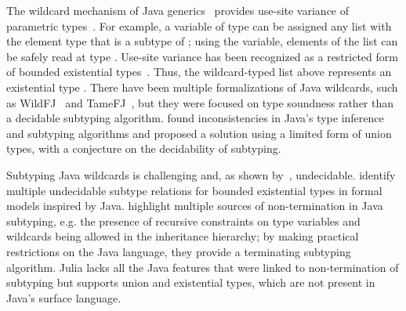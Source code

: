The wildcard mechanism of Java generics~\cite{bib:torgersen:wildcards:2004}
provides use-site variance of parametric
types~\cite{bib:thorup:unif-genericity:1999}.
For example, a variable of type 
can be assigned any list with the element type that is a subtype of ;
using the variable, elements of the list can be safely read at type .
Use-site variance has been recognized as a restricted form of bounded existential
types~\cite{bib:igarashi:variance:2002}.
Thus, the wildcard-typed list above represents an existential
type .
There have been multiple formalizations of Java wildcards,
such as WildFJ~\cite{bib:torgersen:wildfj:2005} and
TameFJ~\cite{bib:cameron:java-wildcards:2008}, but they
were focused on type soundness rather than a decidable subtyping algorithm.
\citet{bib:smith:java-type-inf:2008} found inconsistencies in Java's type inference
and subtyping algorithms and proposed a solution using a limited form of union
types, with a conjecture on the decidability of subtyping.

Subtyping Java wildcards is challenging and, as shown
by~\citet{bib:grigore:java-undec:2017},
undecidable.
\citet{bib:wehr:dec-bounded-exist:2009} identify multiple undecidable subtype
relations for bounded existential types in formal models inspired by Java.
\citet{bib:tate:taming-wildcards:2011} highlight multiple sources of 
non-termination in Java subtyping,
e.g. the presence of recursive constraints on type variables
and wildcards being allowed in the inheritance hierarchy;
by making practical restrictions on the Java language,
they provide a terminating subtyping algorithm.
Julia lacks all the Java features that were linked to non-termination of
subtyping but supports union and existential types, which are not present
in Java's surface language.
